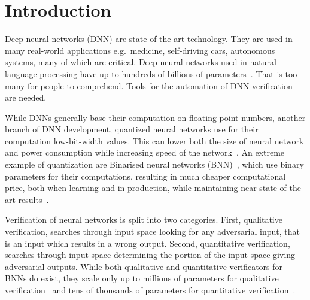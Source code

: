 \chapter*{Introduction}

Deep neural networks (DNN) are state-of-the-art technology. They are used in many
real-world applications e.g.\ medicine, self-driving cars, autonomous systems,
many of which are critical.
Deep neural networks used in natural language processing have up to hundreds of
billions of parameters~\cite{2021arXiv210901652W}.
That is too many for people to comprehend. Tools for the automation
of DNN verification are needed.


While DNNs generally base their computation on floating point numbers,
another branch of DNN development, quantized neural networks
use for their computation low-bit-width values.
This can lower both the size of neural network and power consumption
while increasing speed of the network~\cite{jacob2017,han2016}.
An extreme example of quantization are Binarised neural networks (BNN)~\cite{nips2016},
which use binary parameters for their computations, resulting in much
cheaper computational price, both when learning and in production,
while maintaining near state-of-the-art results~\cite{Agrawal2023}.

Verification of neural networks is split into two categories. First,
qualitative verification, searches through input space looking for any
adversarial input, that is an input which results in a wrong output.
Second, quantitative verification, searches through input space
determining the portion of the input space giving adversarial outputs.
While both qualitative and quantitative verificators for BNNs do exist,
they scale only up to millions of parameters for qualitative verification~\cite{10.1007/978-3-030-03592-1_16}
and tens of thousands of parameters for quantitative verification~\cite{10.1145/3563212}.
\vspace{1em}

